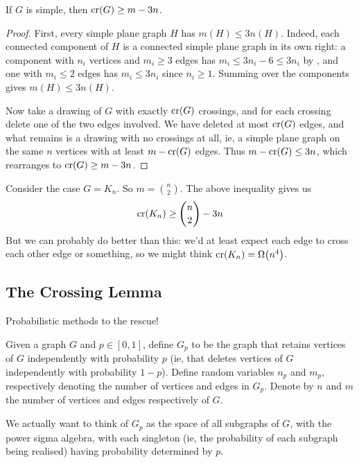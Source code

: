 \begin{boxlemma} \label{Ch7:Lemma:Crossing_Edge_Bound}
    If $G$ is simple, then $\operatorname{cr}\!\left( G \right) \geq m - 3n$.
\end{boxlemma}
\begin{proof}
    First, every simple plane graph $H$ has $m(H) \leq 3n(H)$. Indeed, each connected component of $H$ is a connected simple plane graph in its own right: a component with $n_i$ vertices and $m_i \geq 3$ edges has $m_i \leq 3n_i - 6 \leq 3n_i$ by , and one with $m_i \leq 2$ edges has $m_i \leq 3n_i$ since $n_i \geq 1$. Summing over the components gives $m(H) \leq 3n(H)$.

    Now take a drawing of $G$ with exactly $\operatorname{cr}\!\left( G \right)$ crossings, and for each crossing delete one of the two edges involved. We have deleted at most $\operatorname{cr}\!\left( G \right)$ edges, and what remains is a drawing with no crossings at all, ie, a simple plane graph on the same $n$ vertices with at least $m - \operatorname{cr}\!\left( G \right)$ edges. Thus $m - \operatorname{cr}\!\left( G \right) \leq 3n$, which rearranges to $\operatorname{cr}\!\left( G \right) \geq m - 3n$.
\end{proof}

Consider the case $G = K_n$. So $m = \binom{n}{2}$. The above inequality gives us
\begin{align*}
    \operatorname{cr}\!\left( K_n \right) \geq \binom{n}{2} - 3n
\end{align*}
But we can probably do better than this: we'd at least expect each edge to cross each other edge or something, so we might think $\operatorname{cr}\!\left( K_n \right) = \Omega\!\left( n^4 \right)$.

\subsection{The Crossing Lemma}

Probabilistic methods to the rescue!

\begin{boxlnotation}
    Given a graph $G$ and $p \in [0, 1]$, define $G_p$ to be the graph that retains vertices of $G$ independently with probability $p$ (ie, that deletes vertices of $G$ independently with probability $1 - p$). Define random variables $n_p$ and $m_p$, respectively denoting the number of vertices and edges in $G_p$. Denote by $n$ and $m$ the number of vertices and edges respectively of $G$.
\end{boxlnotation}

We actually want to think of $G_p$ as the space of all subgraphs of $G$, with the power sigma algebra, with each singleton (ie, the probability of each subgraph being realised) having probability determined by $p$.

